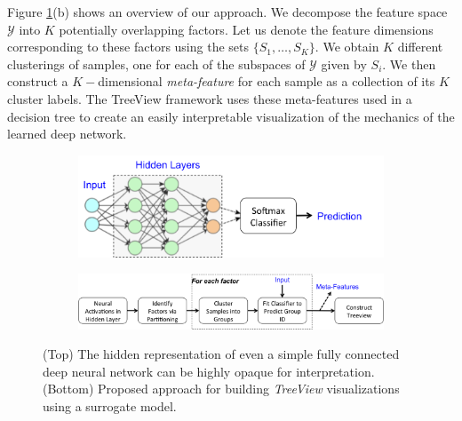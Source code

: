 \documentclass[final]{article}
\begin{document}

Figure \ref{fig:overview}(b) shows an overview of our approach. We decompose the feature space $\mathcal{Y}$ into $K$ potentially overlapping factors. Let us denote the feature dimensions corresponding to these factors using the sets $\{S_1, \ldots, S_K\}$. We obtain $K$ different clusterings of samples, one for each of the subspaces  of $\mathcal{Y}$ given by $S_i$. We then construct a $K-$dimensional \emph{meta-feature} for each sample as a collection of its $K$ cluster labels. The TreeView framework uses these meta-features used in a decision tree to create an easily interpretable visualization of the mechanics of the learned deep network.

\begin{figure}[t]
\centering
\begin{center}
\begin{subfigure}[t]{1.\linewidth}
\centerline{\includegraphics[width=0.5\linewidth]{figs/fcn.png}}
\end{subfigure}

\vspace{0.2in}

\begin{subfigure}[t]{1.\linewidth}
\centerline{\includegraphics[width=0.8\linewidth]{figs/treeview.png}}
\end{subfigure}

\end{center}
\caption{(Top) The hidden representation of even a simple fully connected deep neural network can be highly opaque for interpretation. (Bottom) Proposed approach for building \textit{TreeView} visualizations using a surrogate model.}
\label{fig:overview}
\end{figure}
\newpage 
\end{document}

